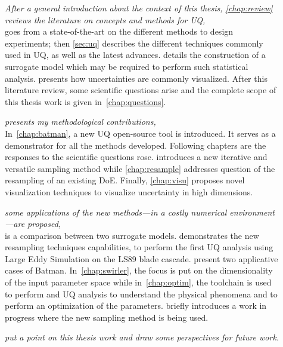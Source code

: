 \begin{description}
	\item[] \emph{After a general introduction about the context of this thesis,  \cref{chap:review} reviews the literature on concepts and methods for UQ,}\hfill\\
 goes from a state-of-the-art on the different methods to design experiments; then \cref{sec:uq} describes the different techniques commonly used in UQ, as well as the latest advances.  details the construction of a surrogate model which may be required to perform such statistical analysis.  presents how uncertainties are commonly visualized. After this literature review, some scientific questions arise and the complete scope of this thesis work is given in~\cref{chap:questions}.

	\item[] \emph{presents my methodological contributions,}\hfill\\
In~\cref{chap:batman}, a new UQ open-source tool is introduced. It serves as a demonstrator for all the methods developed. Following chapters are the responses to the scientific questions rose.  introduces a new iterative and versatile sampling method while \cref{chap:resample} addresses question of the resampling of an existing DoE. Finally, \cref{chap:visu} proposes novel visualization techniques to visualize uncertainty in high dimensions.

	\item[] \emph{some applications of the new methods---in a costly numerical environment---are proposed,}\hfill\\
 is a comparison between two surrogate models.  demonstrates the new resampling techniques capabilities, to perform the first UQ analysis using Large Eddy Simulation on the LS89 blade cascade.  present two applicative cases of Batman. In~\cref{chap:swirler}, the focus is put on the dimensionality of the input parameter space while in~\cref{chap:optim}, the toolchain is used to perform and UQ analysis to understand the physical phenomena and to perform an optimization of the parameters.  briefly introduces a work in progress where the new sampling method is being used.

	\item[] \emph{put a point on this thesis work and draw some perspectives for future work.}
\end{description}


